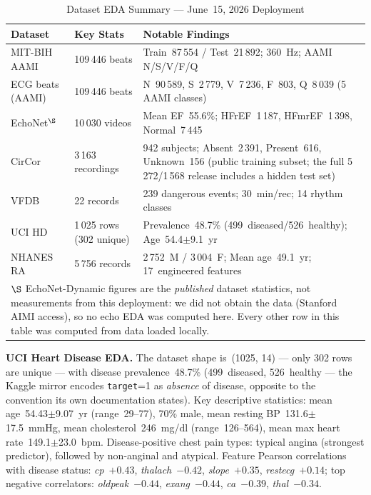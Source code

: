 \documentclass[AMA,STIX1COL,]{WileyNJD-v2}
\begin{document}
\begin{table}[!t]
\caption{Dataset EDA Summary — June~15, 2026 Deployment}
\label{tab:eda}
\centering
\renewcommand{\arraystretch}{1.15}
\small\begin{tabular}{p{1.5cm}p{1.9cm}p{3.4cm}}
\toprule
\textbf{Dataset} & \textbf{Key Stats} & \textbf{Notable Findings}\\
\midrule
MIT-BIH AAMI & 109\,446 beats & Train~87\,554 / Test~21\,892;
  360~Hz; AAMI N/S/V/F/Q\\
ECG beats (AAMI) & 109\,446 beats & N~90\,589, S~2\,779, V~7\,236,
  F~803, Q~8\,039 (5 AAMI classes)\\
EchoNet$^{\S}$ & 10\,030 videos & Mean EF~55.6\%; HFrEF~1\,187,
  HFmrEF~1\,398, Normal~7\,445\\
CirCor & 3\,163 recordings & 942 subjects; Absent~2\,391,
  Present~616, Unknown~156 (public training subset;
  the full 5\,272/1\,568 release includes a hidden test set)\\
VFDB & 22 records & 239 dangerous events; 30~min/rec;
  14 rhythm classes\\
UCI HD & 1\,025 rows (302 unique) & Prevalence~48.7\% (499~diseased/526~healthy);
  Age~54.4$\pm$9.1~yr\\
NHANES RA & 5\,756 records & 2\,752~M / 3\,004~F;
  Mean age~49.1~yr; 17~engineered features\\
\bottomrule
\multicolumn{3}{p{7.2cm}}{\footnotesize $\S$ EchoNet-Dynamic figures are the
\emph{published} dataset statistics, not measurements from this deployment:
we did not obtain the data (Stanford AIMI access), so no echo EDA was computed
here. Every other row in this table was computed from data loaded locally.}\\
\end{tabular}
\end{table}

\noindent\textbf{UCI Heart Disease EDA.}
The dataset shape is~(1025, 14) --- only 302 rows are unique --- with disease prevalence~48.7\%
(499~diseased, 526~healthy --- the Kaggle mirror encodes
\texttt{target}=1 as \emph{absence} of disease, opposite to the
convention its own documentation states). Key descriptive statistics:
mean age~54.43$\pm$9.07~yr (range~29--77), 70\% male,
mean resting BP~131.6$\pm$17.5~mmHg, mean cholesterol~246~mg/dl
(range~126--564), mean max heart rate~149.1$\pm$23.0~bpm.
Disease-positive chest pain types: typical angina (strongest predictor),
followed by non-anginal and atypical. Feature Pearson correlations with
disease status: \emph{cp}~$+0.43$, \emph{thalach}~$-0.42$,
\emph{slope}~$+0.35$, \emph{restecg}~$+0.14$; top negative
correlators: \emph{oldpeak}~$-0.44$, \emph{exang}~$-0.44$,
\emph{ca}~$-0.39$, \emph{thal}~$-0.34$.
\end{document}
